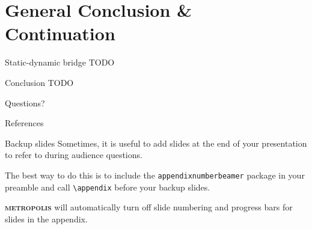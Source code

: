 \documentclass[12pt,aspectratio=169]{beamer}
\newcommand{\themename}{\textbf{\textsc{metropolis}}\xspace}
\begin{document}
%
%
%
\section{General Conclusion \& Continuation}

\begin{frame}{Static-dynamic bridge}
  TODO
\end{frame}

\begin{frame}{Conclusion}
  TODO
\end{frame}



{
\begin{frame}[standout]
  Questions?
\end{frame}
}

\appendix

\begin{frame}[allowframebreaks]{References}
  \printbibliography[heading=none]
\end{frame}

\begin{frame}[fragile]{Backup slides}
  Sometimes, it is useful to add slides at the end of your presentation to
  refer to during audience questions.

  The best way to do this is to include the \verb|appendixnumberbeamer|
  package in your preamble and call \verb|\appendix| before your backup slides.

  \themename will automatically turn off slide numbering and progress bars for
  slides in the appendix.
\end{frame}
\end{document}
